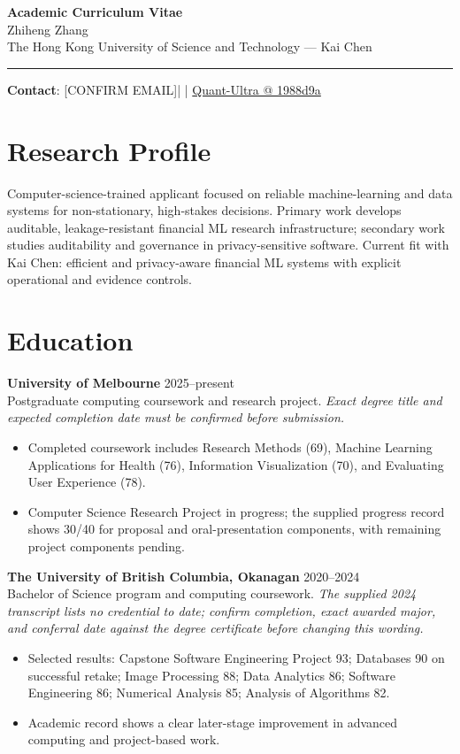 \documentclass[11pt]{article}
\makeatletter
\newcommand{\ApplicantName}{Zhiheng Zhang}
\newcommand{\ApplicantEmail}{[CONFIRM EMAIL]}
\newcommand{\ApplicantPhone}{[CONFIRM PHONE]}
\newcommand{\ApplicantGitHub}{\href{https://github.com/zhiheng-zhang-Mera/Quant-Ultra/tree/1988d9a8530da91a8158de864d098ea869098923}{Quant-Ultra @ 1988d9a}}
\makeatother
\begin{document}
\begin{center}
{\LARGE\bfseries Academic Curriculum Vitae}\\[0.25em]
{\large \ApplicantName}\\
The Hong Kong University of Science and Technology --- Kai Chen
\end{center}
\vspace{0.35em}\hrule\vspace{0.65em}

\textbf{Contact}: \ApplicantEmail\quad | \quad \ApplicantPhone\quad | \quad \ApplicantGitHub

\section*{Research Profile}
Computer-science-trained applicant focused on reliable machine-learning and data systems for non-stationary, high-stakes decisions. Primary work develops auditable, leakage-resistant financial ML research infrastructure; secondary work studies auditability and governance in privacy-sensitive software. Current fit with Kai Chen: efficient and privacy-aware financial ML systems with explicit operational and evidence controls.

\section*{Education}
\textbf{University of Melbourne} \hfill 2025--present\\
Postgraduate computing coursework and research project. \textit{Exact degree title and expected completion date must be confirmed before submission.}
\begin{itemize}
\item Completed coursework includes Research Methods (69), Machine Learning Applications for Health (76), Information Visualization (70), and Evaluating User Experience (78).
\item Computer Science Research Project in progress; the supplied progress record shows 30/40 for proposal and oral-presentation components, with remaining project components pending.
\end{itemize}

\textbf{The University of British Columbia, Okanagan} \hfill 2020--2024\\
Bachelor of Science program and computing coursework. \textit{The supplied 2024 transcript lists no credential to date; confirm completion, exact awarded major, and conferral date against the degree certificate before changing this wording.}
\begin{itemize}
\item Selected results: Capstone Software Engineering Project 93; Databases 90 on successful retake; Image Processing 88; Data Analytics 86; Software Engineering 86; Numerical Analysis 85; Analysis of Algorithms 82.
\item Academic record shows a clear later-stage improvement in advanced computing and project-based work.
\end{itemize}
\end{document}
